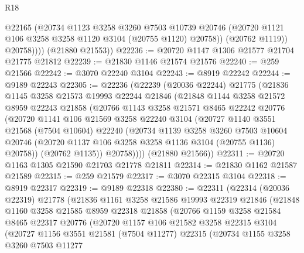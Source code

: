 \begin{lexlean}{R18}
\begin{coremodule}
                @22165
                (@20734
                  @1123
                  @3258
                  @3260
                  @7503
                  @10739
                  @20746
                  (@20720 @1121 @106 @3258 @3258 @1120 @3104 (@20755 @1120) @20758))
                (@20762 @1119))
              @20758))))
      (@21880 @21553))
@22236 := @20720 @1147 @1306 @21577 @21704 @21775 @21812
@22239 := @21830 @1146 @21574 @21576
@22240 := @259 @21566
@22242 := @3070 @22240 @3104
@22243 := @8919 @22242
@22244 := @9189 @22243
@22305 := @22236
    (@22239
      (@20036 @22244)
      @21775
      (@21836
        @1145
        @3258
        @21573
        @19993
        @22244
        @21846
        (@21848
          @1144
          @3258
          @21572
          @8959
          @22243
          @21858
          (@20766
            @1143
            @3258
            @21571
            @8465
            @22242
            @20776
            (@20720
              @1141
              @106
              @21569
              @3258
              @22240
              @3104
              (@20727
                @1140
                @3551
                @21568
                (@7504 @10604)
                @22240
                (@20734
                  @1139
                  @3258
                  @3260
                  @7503
                  @10604
                  @20746
                  (@20720 @1137 @106 @3258 @3258 @1136 @3104 (@20755 @1136) @20758))
                (@20762 @1135))
              @20758))))
      (@21880 @21566))
@22311 := @20720 @1163 @1305 @21590 @21703 @21778 @21811
@22314 := @21830 @1162 @21587 @21589
@22315 := @259 @21579
@22317 := @3070 @22315 @3104
@22318 := @8919 @22317
@22319 := @9189 @22318
@22380 := @22311
    (@22314
      (@20036 @22319)
      @21778
      (@21836
        @1161
        @3258
        @21586
        @19993
        @22319
        @21846
        (@21848
          @1160
          @3258
          @21585
          @8959
          @22318
          @21858
          (@20766
            @1159
            @3258
            @21584
            @8465
            @22317
            @20776
            (@20720
              @1157
              @106
              @21582
              @3258
              @22315
              @3104
              (@20727
                @1156
                @3551
                @21581
                (@7504 @11277)
                @22315
                (@20734
                  @1155
                  @3258
                  @3260
                  @7503
                  @11277

\end{coremodule}
\end{lexlean}
